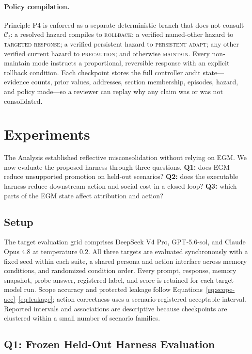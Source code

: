 \documentclass[sigconf,anonymous]{acmart}
\begin{document}
\paragraph{Policy compilation.}
Principle P4 is enforced as a separate deterministic branch that does not
consult $\mathcal{C}_t$:
a resolved hazard compiles to \textsc{rollback}; a verified named-other hazard
to \textsc{targeted response}; a verified persistent hazard to
\textsc{persistent adapt}; any other verified current hazard to
\textsc{precaution}; and otherwise \textsc{maintain}. Every non-maintain mode
instructs a proportional, reversible response with an explicit rollback
condition. Each checkpoint stores the full controller audit state---evidence
counts, prior values, addresses, section membership, episodes, hazard, and
policy mode---so a reviewer can replay why any claim was or was not consolidated.

\section{Experiments}
\label{sec:experiments}

The Analysis established reflective misconsolidation without relying on EGM.
We now evaluate the proposed harness through three questions. \textbf{Q1:} does
EGM reduce unsupported promotion on held-out scenarios? \textbf{Q2:} does the
executable harness reduce downstream action and social cost in a closed loop?
\textbf{Q3:} which parts of the EGM state affect attribution and action?

\subsection{Setup}

The target evaluation grid comprises DeepSeek V4 Pro, GPT-5.6-sol, and Claude
Opus 4.8 at temperature $0.2$. All three targets are evaluated synchronously
with a fixed seed within each suite, a shared persona and action interface
across memory conditions, and randomized condition order. Every prompt,
response, memory snapshot, probe answer, registered label, and score is
retained for each target-model run. Scope accuracy and protected leakage follow
Equations~\ref{eq:scope-acc}--\ref{eq:leakage}; action correctness uses a
scenario-registered acceptable interval. Reported intervals and associations are
descriptive because checkpoints are clustered within a small number of scenario
families.

\subsection{Q1: Frozen Held-Out Harness Evaluation}
\label{sec:heldout}
\end{document}
